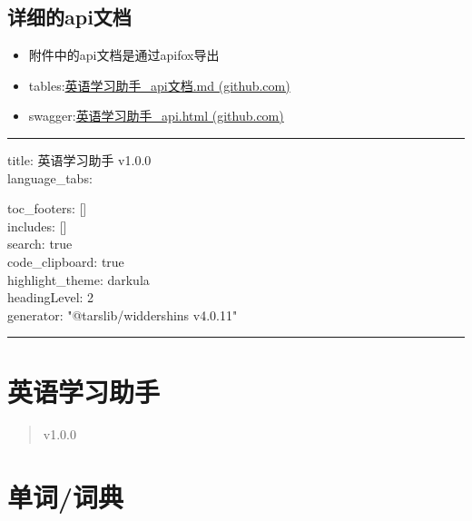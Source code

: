 \documentclass[
]{article}
\begin{document}
\hypertarget{ux8be6ux7ec6ux7684apiux6587ux6863}{%
\subsection{详细的api文档}\label{ux8be6ux7ec6ux7684apiux6587ux6863}}

\begin{itemize}
\item
  附件中的api文档是通过apifox导出
\item
  tables:\href{https://github.com/MaterialSharing/docs/blob/main/design/英语学习助手_api文档.md}{英语学习助手\_api文档.md
  (github.com)}
\item
  swagger:\href{https://github.com/MaterialSharing/docs/blob/main/design/英语学习助手_api.html}{英语学习助手\_api.html
  (github.com)}
\end{itemize}

\begin{center}\rule{0.5\linewidth}{0.5pt}\end{center}

title: 英语学习助手 v1.0.0\\
language\_tabs:

toc\_footers: {[}{]}\\
includes: {[}{]}\\
search: true\\
code\_clipboard: true\\
highlight\_theme: darkula\\
headingLevel: 2\\
generator: "@tarslib/widdershins v4.0.11"

\begin{center}\rule{0.5\linewidth}{0.5pt}\end{center}

\hypertarget{ux82f1ux8bedux5b66ux4e60ux52a9ux624b}{%
\section{英语学习助手}\label{ux82f1ux8bedux5b66ux4e60ux52a9ux624b}}

\begin{quote}
v1.0.0
\end{quote}

\hypertarget{ux5355ux8bcdux8bcdux5178}{%
\section{单词/词典}\label{ux5355ux8bcdux8bcdux5178}}
\end{document}
